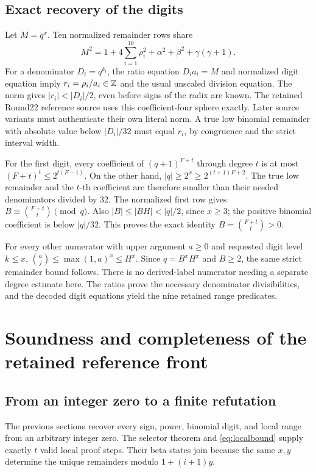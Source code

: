 \subsection{Exact recovery of the digits}

Let $M=q^x$. Ten normalized remainder rows share
\begin{equation}\label{eq:remaindernorm}
 M^2=1+4\sum_{i=1}^{10}\rho_i^2+\alpha^2+\beta^2+\gamma(\gamma+1).
\end{equation}
For a denominator $D_i=q^{k_i}$, the ratio equation
$D_i a_i=M$ and normalized digit equation imply
$r_i=\rho_i/a_i\in\mathbb Z$ and the usual unscaled division equation.
The norm gives $|r_i|<|D_i|/2$, even before signs of the radix
are known. The retained Round22 reference source uses this coefficient-four
sphere exactly. Later source variants must authenticate their own literal norm. A true low binomial remainder with absolute value below
$|D_i|/32$ must equal $r_i$, by congruence and the strict interval width.

For the first digit, every coefficient of $(q+1)^{F+t}$ through degree
$t$ is at most $(F+t)^t\le2^{t(F-1)}$. On the other hand,
$|q|\ge2^x\ge2^{(t+1)F+2}$. The true low remainder and the
$t$-th coefficient are therefore smaller than their needed denominators
divided by $32$. The normalized first row gives
$B\equiv \binom{F+t}{t}\pmod q$. Also
$|B|\le|BH|<|q|/2$, since $x\ge3$; the positive binomial coefficient
is below $|q|/32$. This proves the exact identity
$B=\binom{F+t}{t}>0$.

For every other numerator with upper argument $a\ge0$ and requested
digit level $k\le x$,
$\binom{a}{j}\le\max(1,a)^x\le H^x$. Since $q=B^xH^x$ and
$B\ge2$, the same strict remainder bound follows. There is no
derived-label numerator needing a separate degree estimate here.
The ratios prove the necessary denominator divisibilities, and the
decoded digit equations yield the nine retained range predicates.

\section{Soundness and completeness of the retained reference front}

\subsection{From an integer zero to a finite refutation}

The previous sections recover every sign, power, binomial digit, and
local range from an arbitrary integer zero. The selector theorem and
\eqref{eq:localbound} supply exactly $t$ valid local proof steps.
Their beta states join because the same $x,y$ determine the unique
remainders modulo $1+(i+1)y$.

